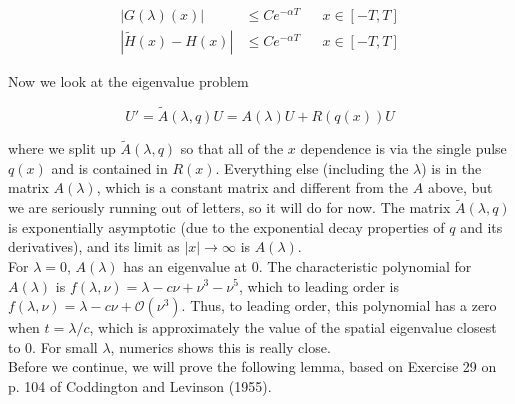 \documentclass[12pt]{article}
\begin{document}
\begin{align*}
|G(\lambda)(x)| &\leq C e^{-\alpha T} && x \in [-T, T]\\
|\tilde{H}(x) - H(x)| &\leq C e^{-\alpha T} && x \in [-T, T]
\end{align*}

Now we look at the eigenvalue problem

\begin{equation}
U' = \tilde{A}(\lambda, q) U = A(\lambda) U + R(q(x)) U
\end{equation}

where we split up $\tilde{A}(\lambda, q)$ so that all of the $x$ dependence is via the single pulse $q(x)$ and is contained in $R(x)$. Everything else (including the $\lambda$) is in the matrix $A(\lambda)$, which is a constant matrix and different from the $A$ above, but we are seriously running out of letters, so it will do for now. The matrix $\tilde{A}(\lambda, q)$ is exponentially asymptotic (due to the exponential decay properties of $q$ and its derivatives), and its limit as $|x| \rightarrow \infty$ is $A(\lambda)$.\\

For $\lambda = 0$, $A(\lambda)$ has an eigenvalue at 0. The characteristic polynomial for $A(\lambda)$ is $f(\lambda, \nu) = \lambda - c \nu + \nu^3 - \nu^5$, which to leading order is $f(\lambda, \nu) = \lambda - c \nu + \mathcal{O}(\nu^3)$. Thus, to leading order, this polynomial has a zero when $t = \lambda / c$, which is approximately the value of the spatial eigenvalue closest to 0. For small $\lambda$, numerics shows this is really close.\\

Before we continue, we will prove the following lemma, based on Exercise 29 on p. 104 of Coddington and Levinson (1955).
\end{document}
